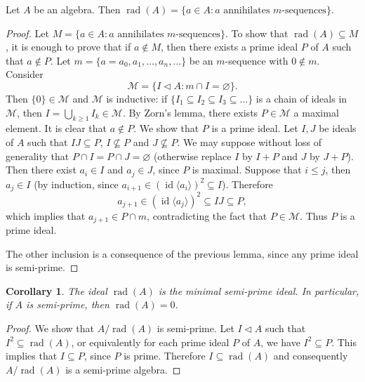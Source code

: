 \documentclass{article}
\newtheorem{corollary}[theorem]{Corollary}
\begin{document}
\begin{theorem}
Let $A$ be an algebra. Then $\operatorname{rad}(A) = \{a \in A : a \text{ annihilates } m\text{-sequences}\}$.
\end{theorem}

\begin{proof}
Let $M = \{a \in A : a \text{ annihilates } m\text{-sequences}\}$. To show that $\operatorname{rad}(A) \subseteq M$, it is enough to prove that if $a \notin M$, then there exists a prime ideal $P$ of $A$ such that $a \notin P$. Let $m = \{a = a_0, a_1, \dots, a_{n}, \dots\}$ be an $m$-sequence with $0 \notin m$. Consider
\[
\mathcal{M} = \{I \triangleleft A : m \cap I = \varnothing\}.
\]
Then $\{0\} \in \mathcal{M}$ and $\mathcal{M}$ is inductive: if $\{I_1 \subseteq I_2 \subseteq I_3 \subseteq \dots\}$ is a chain of ideals in $\mathcal{M}$, then $I = \bigcup_{k \geq 1} I_k \in \mathcal{M}$. By Zorn's lemma, there exists $P \in \mathcal{M}$ a maximal element. It is clear that $a \notin P$. We show that $P$ is a prime ideal. Let $I, J$ be ideals of $A$ such that $IJ \subseteq P$, $I \nsubseteq P$ and $J \nsubseteq P$. We may suppose without loss of generality that $P \cap I = P \cap J = \varnothing$ (otherwise replace $I$ by $I + P$ and $J$ by $J + P$). Then there exist $a_i \in I$ and $a_j \in J$, since $P$ is maximal. Suppose that $i \leq j$, then $a_j \in I$ (by induction, since $a_{i+1} \in (\operatorname{id}\langle a_i\rangle)^2 \subseteq I$). Therefore
\[
a_{j+1} \in (\operatorname{id}\langle a_j\rangle)^2 \subseteq IJ \subseteq P,
\]
which implies that $a_{j+1} \in P \cap m$, contradicting the fact that $P \in \mathcal{M}$. Thus $P$ is a prime ideal.

The other inclusion is a consequence of the previous lemma, since any prime ideal is semi-prime.
\end{proof}

\begin{corollary}
The ideal $\operatorname{rad}(A)$ is the minimal semi-prime ideal. In particular, if $A$ is semi-prime, then $\operatorname{rad}(A) = 0$.
\end{corollary}

\begin{proof}
We show that $A/\operatorname{rad}(A)$ is semi-prime. Let $I \triangleleft A$ such that $I^2 \subseteq \operatorname{rad}(A)$, or equivalently for each prime ideal $P$ of $A$, we have $I^2 \subseteq P$. This implies that $I \subseteq P$, since $P$ is prime. Therefore $I \subseteq \operatorname{rad}(A)$ and consequently $A/\operatorname{rad}(A)$ is a semi-prime algebra.
\end{proof}
\end{document}
